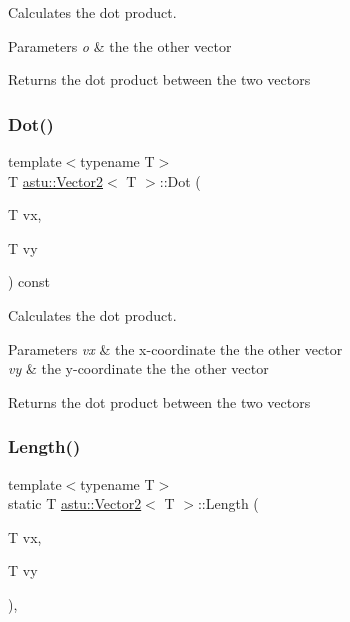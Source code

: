 Calculates the dot product.


\begin{DoxyParams}{Parameters}
{\em o} & the the other vector \\
\hline
\end{DoxyParams}
\begin{DoxyReturn}{Returns}
the dot product between the two vectors 
\end{DoxyReturn}
\mbox{\label{classastu_1_1Vector2_a0fb863e03982e1583a0945873caf92d7}} 
\subsubsection{\texorpdfstring{Dot()}{Dot()}\hspace{0.1cm}{\footnotesize\ttfamily [2/2]}}
{\footnotesize\ttfamily template$<$typename T$>$ \\
T \hyperlink{classastu_1_1Vector2}{astu\+::\+Vector2}$<$ T $>$\+::Dot (\begin{DoxyParamCaption}\item[{T}]{vx,  }\item[{T}]{vy }\end{DoxyParamCaption}) const\hspace{0.3cm}{\ttfamily [inline]}}

Calculates the dot product.


\begin{DoxyParams}{Parameters}
{\em vx} & the x-\/coordinate the the other vector \\
\hline
{\em vy} & the y-\/coordinate the the other vector \\
\hline
\end{DoxyParams}
\begin{DoxyReturn}{Returns}
the dot product between the two vectors 
\end{DoxyReturn}
\mbox{\label{classastu_1_1Vector2_a7fdf839b6c3444121dc6fb2eb88c200e}} 
\subsubsection{\texorpdfstring{Length()}{Length()}\hspace{0.1cm}{\footnotesize\ttfamily [1/2]}}
{\footnotesize\ttfamily template$<$typename T$>$ \\
static T \hyperlink{classastu_1_1Vector2}{astu\+::\+Vector2}$<$ T $>$\+::Length (\begin{DoxyParamCaption}\item[{T}]{vx,  }\item[{T}]{vy }\end{DoxyParamCaption})\hspace{0.3cm}{\ttfamily [inline]}, {\ttfamily [static]}}

